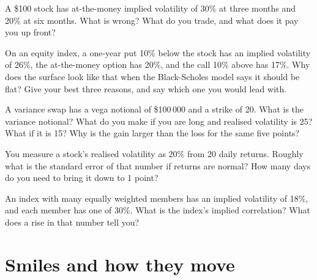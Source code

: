\begin{question}\label{iq:iv2:vol-surface-and-vol-trading:5}
A \$100 stock has at-the-money implied volatility of 30\% at three months and 20\% at six months. What is wrong? What do you trade, and what does it pay you up front?
\end{question}

\begin{question}\label{iq:iv2:vol-surface-and-vol-trading:6}
On an equity index, a one-year put 10\% below the stock has an implied volatility of 26\%, the at-the-money option has 20\%, and the call 10\% above has 17\%. Why does the surface look like that when the Black-Scholes model says it should be flat? Give your best three reasons, and say which one you would lead with.
\end{question}

\begin{question}\label{iq:iv2:vol-surface-and-vol-trading:7}
A variance swap has a vega notional of \$100\,000 and a strike of 20. What is the variance notional? What do you make if you are long and realised volatility is 25? What if it is 15? Why is the gain larger than the loss for the same five points?
\end{question}

\begin{question}\label{iq:iv2:vol-surface-and-vol-trading:8}
You measure a stock's realised volatility as 20\% from 20 daily returns. Roughly what is the standard error of that number if returns are normal? How many days do you need to bring it down to 1 point?
\end{question}

\begin{question}\label{iq:iv2:vol-surface-and-vol-trading:9}
An index with many equally weighted members has an implied volatility of 18\%, and each member has one of 30\%. What is the index's implied correlation? What does a rise in that number tell you?
\end{question}

\section{Smiles and how they move}

